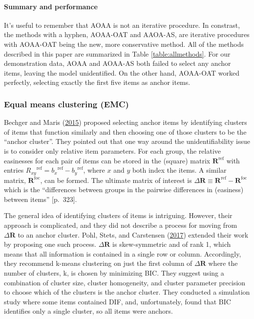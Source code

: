 \documentclass[
  11pt,
]{article}
\begin{document}
\hypertarget{summary-and-performance}{%
\paragraph{Summary and performance}\label{summary-and-performance}}

It's useful to remember that AOAA is not an iterative procedure. In constrast, the methods with a hyphen, AOAA-OAT and AAOA-AS, are iterative procedures with AOAA-OAT being the new, more conservative method. All of the methods described in this paper are summarized in Table \ref{table:allmethods}. For our demonstration data, AOAA and AOAA-AS both failed to select any anchor items, leaving the model unidentified. On the other hand, AOAA-OAT worked perfectly, selecting exactly the first five items as anchor items.

\hypertarget{equal-means-clustering-emc}{%
\subsubsection{Equal means clustering (EMC)}\label{equal-means-clustering-emc}}

Bechger and Maris (\protect\hyperlink{ref-bechger2015statistical}{2015}) proposed selecting anchor items by identifying clusters of items that function similarly and then choosing one of those clusters to be the \enquote{anchor cluster}. They pointed out that one way around the unidentifiability issue is to consider only relative item parameters. For each group, the relative easinesses for each pair of items can be stored in the (square) matrix \(\mathbf{R}^{\text{ref}}\) with entries \({R_{xy}}^{\text{ref}} = {b_x}^{\text{ref}} - {b_y}^{\text{ref}}\), where \(x\) and \(y\) both index the items. A similar matrix, \(\mathbf{R}^{\text{foc}}\), can be formed. The ultimate matrix of interest is \(\Delta \mathbf{R} \equiv \mathbf{R}^{\text{ref}}-\mathbf{R}^{\text{foc}}\) which is the \enquote{differences between groups in the pairwise differences in (easiness) between items} {[}p.~323{]}.

The general idea of identifying clusters of items is intriguing. However, their approach is complicated, and they did not describe a process for moving from \(\Delta \mathbf{R}\) to an anchor cluster. Pohl, Stets, and Carstensen (\protect\hyperlink{ref-pohl2017cluster}{2017}) extended their work by proposing one such process. \(\Delta \mathbf{R}\) is skew-symmetric and of rank 1, which means that all information is contained in a single row or column. Accordingly, they recommend k-means clustering on just the first column of \(\Delta \mathbf{R}\) where the number of clusters, k, is chosen by minimizing BIC. They suggest using a combination of cluster size, cluster homogeneity, and cluster parameter precision to choose which of the clusters is the anchor cluster. They conducted a simulation study where some items contained DIF, and, unfortunately, found that BIC identifies only a single cluster, so all items were anchors.
\end{document}
